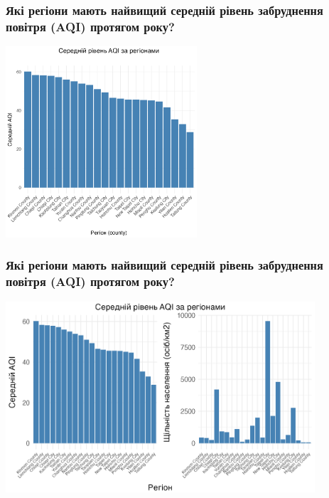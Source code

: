 \documentclass{beamer}
\begin{document}
\begin{frame}
  \frametitle{Які регіони мають найвищий середній рівень забруднення повітря (AQI) протягом року?}

  \begin{center}
    \includegraphics[height=2.8in]{plots/question4/avg_aqi_by_county.png}
  \end{center}
\end{frame}

\begin{frame}
  \frametitle{Які регіони мають найвищий середній рівень забруднення повітря (AQI) протягом року?}

  \begin{center}
    \includegraphics[height=2.8in]{plots/question4/avg_aqi_by_county_w_dens.png}
  \end{center}
\end{frame}
\end{document}
